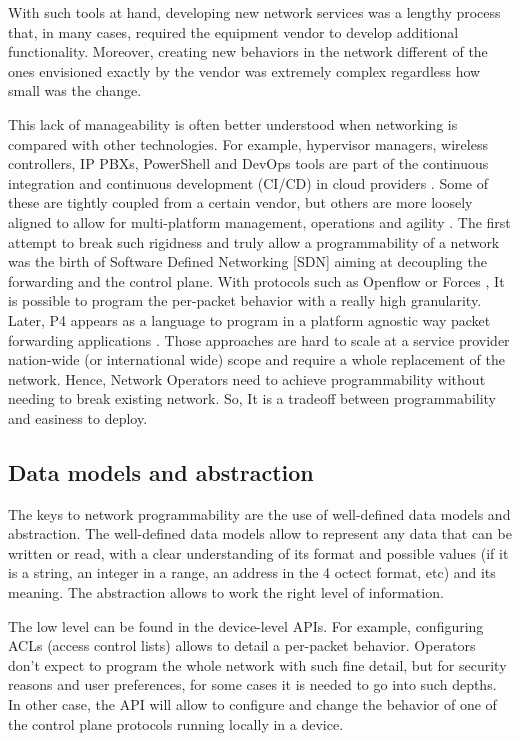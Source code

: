 \documentclass[a4paper,fleqn]{cas-dc}
\begin{document}
With such tools at hand, developing new network services was a lengthy process that, in many cases, required the equipment vendor to develop additional functionality. Moreover, creating new behaviors in the network different of the ones envisioned exactly by the vendor was extremely complex regardless how small was the change.

This lack of manageability is often better understood when networking is compared with other technologies. For example, hypervisor managers, wireless controllers, IP PBXs, PowerShell and DevOps tools are part of the continuous integration and continuous development (CI/CD) in cloud providers \cite{mittal2017cloud,demchenko2016zerotouch}. Some of these are tightly coupled from a certain vendor, but others are more loosely aligned to allow for multi-platform management, operations and agility \cite{edelman2018network}.
The first attempt to break such rigidness and truly allow a programmability of a network was the birth of Software Defined Networking [SDN] aiming at decoupling the forwarding and the control plane. With protocols such as Openflow \cite{mckeown2008openflow} or Forces \cite{doria2010forwarding}, It is possible to program the per-packet behavior with a really high granularity. Later, P4 appears as a language to program in a platform agnostic way packet forwarding applications \cite{bosshart2014p4}. Those approaches are hard to scale at a service provider nation-wide (or international wide) scope and require a whole replacement of the network. Hence, Network Operators need to achieve programmability without needing to break existing network. So, It is a tradeoff between programmability and easiness to deploy. 

\subsection{Data models and abstraction}

The keys to network programmability are the use of well-defined data models and abstraction. The well-defined data models allow to represent any data that can be written or read, with a clear understanding of its format and possible values (if it is a string, an integer in a range, an address in the 4 octect format, etc) and its meaning.  The abstraction allows to work the right level of information. 

The low level can be found in the device-level APIs. For example, configuring ACLs (access control lists) allows to detail a per-packet behavior. Operators don’t expect to program the whole network with such fine detail, but for security reasons and user preferences, for some cases it is needed to go into such depths. In other case, the API will allow to configure and change the behavior of one of the control plane protocols running locally in a device.
\end{document}
